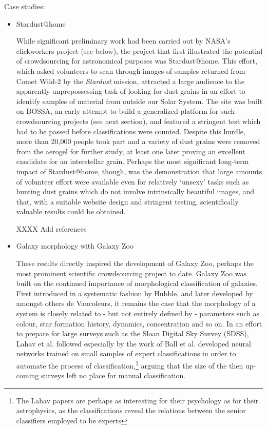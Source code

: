 \documentclass{ar2e}
\begin{document}
Case studies:
\begin{itemize}
\item Stardust@home

While significant preliminary work had been carried out by NASA's clickworkers project (see below), the project that first illustrated the potential of crowdsourcing for astronomical purposes was Stardust@home. This effort, which asked volunteers to scan through images of samples returned from Comet Wild-2 by the \emph{Stardust} mission, attracted a large audience to the apparently unprepossessing task of looking for dust grains in an effort to identify samples of material from outside our Solar System. The site was built on BOSSA, an early attempt to build a generalized platform for such crowdsourcing projects (see next section), and featured a stringent test which had to be passed before classifications were counted. Despite this hurdle, more than 20,000 people took part and a variety of dust grains were removed from the aerogel for further study, at least one later proving an excellent candidate for an interstellar grain. Perhaps the most significant long-term impact of Stardust@home, though, was the demonstration that large amounts of volunteer effort were available even for relatively `unsexy' tasks such as hunting dust grains which do not involve intrinsically beautiful images, and that, with a suitable website design and stringent testing, scientifically valuable results could be obtained. 

XXXX Add references 


\item Galaxy morphology with Galaxy Zoo

These results directly inspired the development of Galaxy Zoo, perhaps the most prominent scientific crowdsourcing project to date. Galaxy Zoo was built on the continued importance of morphological classification of galaxies. First introduced in a systematic fashion by Hubble, and later developed by amongst others de Vaucoleurs, it remains the case that the morphology of a system is closely related to - but not entirely defined by - parameters such as colour, star formation history, dynamics, concentration and so on. In an effort to prepare for large surveys such as the Sloan Digital Sky Survey (SDSS), Lahav et al. followed especially by the work of Ball et al. developed neural networks trained on small samples of expert classifications in order to automate the process of classification,\footnote{The Lahav papers are perhaps as interesting for their psychology as for their astrophysics, as the classifications reveal the relations between the senior classifiers employed to be experts} arguing that the size of the then up-coming surveys left no place for manual classification.


\end{itemize}
\end{document}
